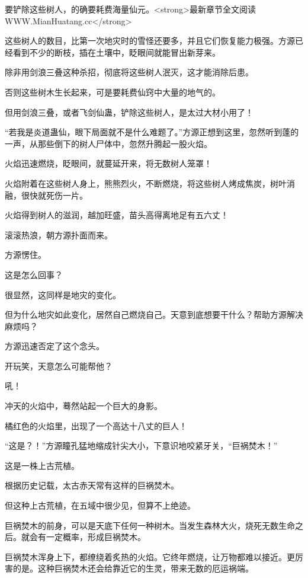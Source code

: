 
\begin{this_body}

要铲除这些树人，的确要耗费海量仙元。<strong>最新章节全文阅读WWW.MianHuatang.cc</strong>

这些树人的数目，比第一次地灾时的雪怪还要多，并且它们恢复能力极强。方源已经看到不少的断枝，插在土壤中，眨眼间就能冒出新芽来。

除非用剑浪三叠这种杀招，彻底将这些树人泯灭，这才能消除后患。

否则这些树木生长起来，可是要耗费仙窍中大量的地气的。

但用剑浪三叠，或者飞剑仙蛊，铲除这些树人，是太过大材小用了！

“若我是炎道蛊仙，眼下局面就不是什么难题了。”方源正想到这里，忽然听到蓬的一声，从那些倒下的树人尸体中，忽然升腾起一股火焰。

火焰迅速燃烧，眨眼间，就蔓延开来，将无数树人笼罩！

火焰附着在这些树人身上，熊熊烈火，不断燃烧，将这些树人烤成焦炭，树叶消融，很快就死伤一片。

火焰得到树人的滋润，越加旺盛，苗头高得离地足有五六丈！

滚滚热浪，朝方源扑面而来。

方源愣住。

这是怎么回事？

很显然，这同样是地灾的变化。

但为什么地灾如此变化，居然自己燃烧自己。天意到底想要干什么？帮助方源解决麻烦吗？

方源迅速否定了这个念头。

开玩笑，天意怎么可能帮他？

吼！

冲天的火焰中，蓦然站起一个巨大的身影。

橘红色的火焰里，出现了一个高达十八丈的巨人！

“这是？！”方源瞳孔猛地缩成针尖大小，下意识地咬紧牙关，“巨祸焚木！”

这是一株上古荒植。

根据历史记载，太古赤天常有这样的巨祸焚木。

但这种上古荒植，在五域中很少见，但算不上绝迹。

巨祸焚木的前身，可以是天底下任何一种树木。当发生森林大火，烧死无数生命之后。就会有一定概率，形成巨祸焚木。

巨祸焚木浑身上下，都缭绕着炙热的火焰。它终年燃烧，让万物都难以接近。更厉害的是。这种巨祸焚木还会给靠近它的生灵，带来无数的厄运祸端。


\end{this_body}
